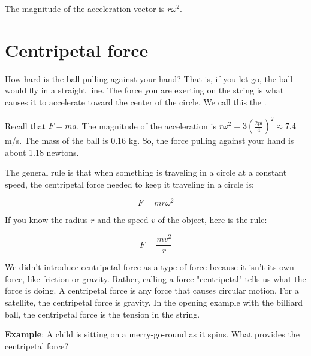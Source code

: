 
The magnitude of the acceleration vector is $r \omega^2$.

\section{Centripetal force}

How hard is the ball pulling against your hand?  That is, if you let
go, the ball would fly in a straight line.  The force you are exerting
on the string is what causes it to accelerate toward the center of the
circle. We call this the .

Recall that $F = m a$.  The magnitude of the acceleration is $r
\omega^2 = 3 \left(\frac{2 pi}{4}\right)^2 \approx 7.4$ m/s.  The mass
of the ball is 0.16 kg.  So, the force pulling against your hand is
about 1.18 newtons.

The general rule is that when something is traveling in a circle at a
constant speed, the centripetal force needed to keep it traveling in a
circle is:

$$F = m r \omega^2$$

If you know the radius $r$ and the speed $v$ of the object, here is the rule:

$$F = \frac{m v^2}{r}$$

We didn't introduce centripetal force as a type of force because it isn't its own force, like friction or gravity. Rather, calling a force "centripetal" tells us what the force is doing. A centripetal force is any force that causes circular motion. For a satellite, the centripetal force is gravity. In the opening example with the billiard ball, the centripetal force is the tension in the string. 

\textbf{Example}: A child is sitting on a merry-go-round as it spins. What provides the centripetal force? 

